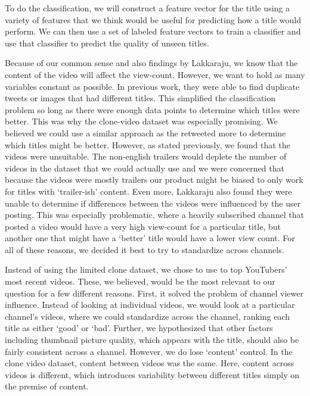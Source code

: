 \documentclass[a4paper,12pt]{article}
\begin{document}
To do the classification, we will construct a feature vector for the title using a variety of features that we think would be useful for predicting how a title would perform. We can then use a set of labeled feature vectors to train a classifier and use that classifier to predict the quality of unseen titles.

Because of our common sense and also findings by Lakkaraju, we know that the content of the video will affect the view-count. However, we want to hold as many variables constant as possible. In previous work, they were able to find duplicate tweets or images that had different titles. This simplified the classification problem so long as there were enough data points to determine which titles were better. This was why the clone-video dataset was especially promising. We believed we could use a similar approach as the retweeted more to determine which titles might be better. However, as stated previously, we found that the videos were unsuitable. The non-english trailers would deplete the number of videos in the dataset that we could actually use and we were concerned that because the videos were mostly trailers our product might be biased to only work for titles with `trailer-ish' content. Even more, Lakkaraju also found they were unable to determine if differences between the videos were influenced by the user posting. This was especially problematic, where a heavily subscribed channel that posted a video would have a very high view-count for a particular title, but another one that might have a `better' title would have a lower view count. For all of these reasons, we decided it best to try to standardize across channels.

Instead of using the limited clone dataset, we chose to use to top YouTubers' most recent videos. These, we believed, would be the most relevant to our question for a few different reasons. First, it solved the problem of channel viewer influence. Instead of looking at individual videos, we would look at a particular channel's videos, where we could standardize across the channel, ranking each title as either `good' or `bad'. Further, we hypothesized that other factors including thumbnail picture quality, which appears with the title, should also be fairly consistent across a channel. However, we do lose `content' control. In the clone video dataset, content between videos was the same. Here, content across videos is different, which introduces variability between different titles simply on the premise of content. 
\end{document}
